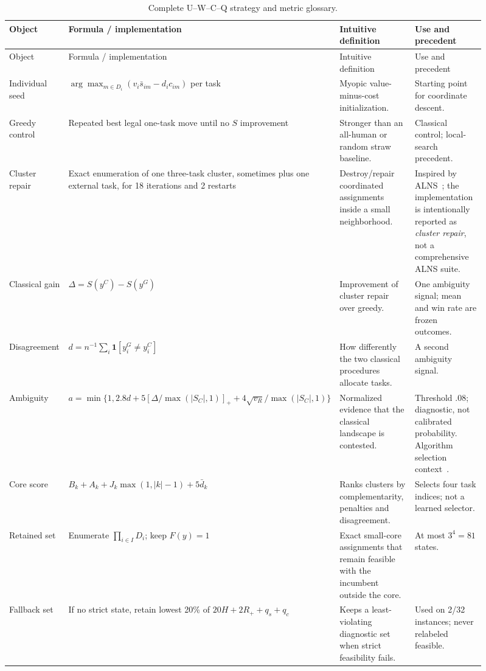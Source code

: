 \begingroup
\small
\setlength{\tabcolsep}{3pt}
\begin{longtable}{@{}p{0.14\linewidth}p{0.25\linewidth}p{0.25\linewidth}p{0.27\linewidth}@{}}
\caption{Complete \textsc{U--W--C--Q} strategy and metric glossary.}\label{tab:uwcqglossary}\\
\toprule
Object & Formula / implementation & Intuitive definition & Use and precedent \\
\midrule
\endfirsthead
\toprule
Object & Formula / implementation & Intuitive definition & Use and precedent \\
\midrule
\endhead
Individual seed & $\arg\max_{m\in D_i}(v_i\bar s_{im}-d_ic_{im})$ per task & Myopic value-minus-cost initialization. & Starting point for coordinate descent. \\
Greedy control & Repeated best legal one-task move until no $S$ improvement & Stronger than an all-human or random straw baseline. & Classical control; local-search precedent. \\
Cluster repair & Exact enumeration of one three-task cluster, sometimes plus one external task, for 18 iterations and 2 restarts & Destroy/repair coordinated assignments inside a small neighborhood. & Inspired by ALNS~\citep{ropke2006alns}; the implementation is intentionally reported as \emph{cluster repair}, not a comprehensive ALNS suite. \\
Classical gain & $\Delta=S(y^C)-S(y^G)$ & Improvement of cluster repair over greedy. & One ambiguity signal; mean and win rate are frozen outcomes. \\
Disagreement & $d=n^{-1}\sum_i\mathbf1[y_i^G\ne y_i^C]$ & How differently the two classical procedures allocate tasks. & A second ambiguity signal. \\
Ambiguity & $a=\min\{1,2.8d+5[\Delta/\max(|S_C|,1)]_++4\sqrt{v_R}/\max(|S_C|,1)\}$ & Normalized evidence that the classical landscape is contested. & Threshold $.08$; diagnostic, not calibrated probability. Algorithm selection context~\citep{rice1976algorithm,kotthoff2014algorithm}. \\
Core score & $B_k+A_k+J_k\max(1,|k|-1)+5\bar d_k$ & Ranks clusters by complementarity, penalties and disagreement. & Selects four task indices; not a learned selector. \\
Retained set & Enumerate $\prod_{i\in I}D_i$; keep $F(y)=1$ & Exact small-core assignments that remain feasible with the incumbent outside the core. & At most $3^4=81$ states. \\
Fallback set & If no strict state, retain lowest 20\% of $20H+2R_++q_s+q_c$ & Keeps a least-violating diagnostic set when strict feasibility fails. & Used on 2/32 instances; never relabeled feasible. \\

\end{longtable}
